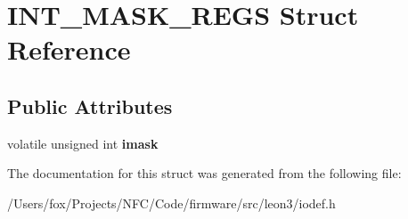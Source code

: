 \hypertarget{struct_i_n_t___m_a_s_k___r_e_g_s}{
\section{INT\_\-MASK\_\-REGS Struct Reference}
\label{struct_i_n_t___m_a_s_k___r_e_g_s}
}
\subsection*{Public Attributes}
\begin{DoxyCompactItemize}
\item 
\hypertarget{struct_i_n_t___m_a_s_k___r_e_g_s_a9e9a348f841500782ddd7183e9c88e7f}{
volatile unsigned int {\bfseries imask}}
\label{struct_i_n_t___m_a_s_k___r_e_g_s_a9e9a348f841500782ddd7183e9c88e7f}

\end{DoxyCompactItemize}


The documentation for this struct was generated from the following file:\begin{DoxyCompactItemize}
\item 
/Users/fox/Projects/NFC/Code/firmware/src/leon3/iodef.h\end{DoxyCompactItemize}
